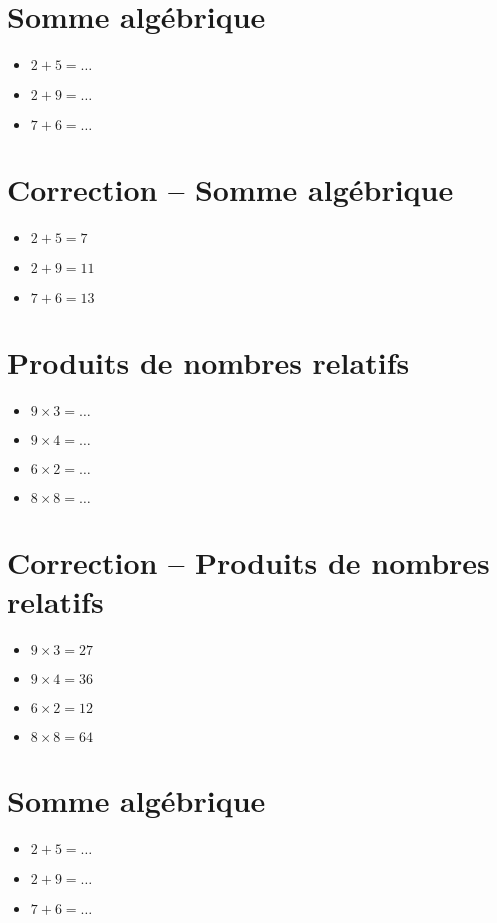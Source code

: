 \documentclass[a4paper,11pt,fleqn]{article}
\begin{document}
\section{Somme algébrique}
\begin{itemize}

3
3
3
3
3
3
3
3
3
3
  \item $2+5=\ldots$
  \item $2+9=\ldots$
  \item $7+6=\ldots$
\end{itemize}

\section{Correction -- Somme algébrique}
\begin{itemize}

  \item $2+5=7$
  \item $2+9=11$
  \item $7+6=13$
\end{itemize}

\section{Produits de nombres relatifs}
\begin{itemize}

  \item $9\times3=\ldots$
  \item $9\times4=\ldots$
  \item $6\times2=\ldots$
  \item $8\times8=\ldots$
\end{itemize}

\section{Correction -- Produits de nombres relatifs}
\begin{itemize}

  \item $9\times3=27$
  \item $9\times4=36$
  \item $6\times2=12$
  \item $8\times8=64$
\end{itemize}
\newpage
\setcounter{exo}{0}
\setcounter{section}{0}
\section{Somme algébrique}
\begin{itemize}

3
3
3
3
3
3
3
3
3
3
  \item $2+5=\ldots$
  \item $2+9=\ldots$
  \item $7+6=\ldots$
\end{itemize}
\end{document}
